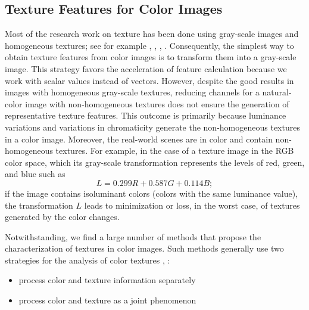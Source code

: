 \subsection{Texture Features for Color Images}
Most of the research work on texture has been done using gray-scale images and homogeneous textures; see for example \citep{Jain.Farrokhnia:IJPR:1991}, \citep{ChengjunLiu.Wechsler:NN:2003}, \citep{Liu.Koga.ea:ICDAR:2005}, \citep{Al-Kadi:arXiv:2017}. Consequently, the simplest way to obtain texture features from color images is to transform them into a gray-scale image. This strategy favors the acceleration of feature calculation because we work with scalar values instead of vectors. However, despite the good results in images with homogeneous gray-scale textures, reducing channels for a natural-color image with non-homogeneous textures does not ensure the generation of representative texture features. This outcome is primarily because luminance variations and variations in chromaticity generate the non-homogeneous textures in a color image. Moreover, the real-world scenes are in color and contain non-homogeneous textures. For example, in the case of a texture image in the RGB color space, which its gray-scale transformation represents the levels of red, green, and blue \citep{Artusi.Banterle.ea:Book:2016} such as
\begin{equation}\label{eq:color2gray_formula}
    L = 0.299 R + 0.587 G + 0.114 B;
\end{equation} 
if the image contains isoluminant colors (colors with the same luminance value), the transformation $L$ leads to minimization or loss, in the worst case, of textures generated by the color changes.


Notwithstanding, we find a large number of methods that propose the characterization of textures in color images. Such methods generally use two strategies for the analysis of color textures \citep{Maenpaa.Pietikainen:PR:2004}, \citep{Qazi.Alata.ea:PR:2011}:

\begin{itemize}
	\item process color and texture information separately
	\item process color and texture as a joint phenomenon
\end{itemize} 

